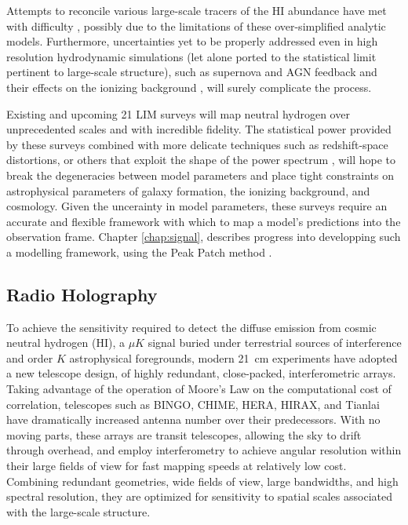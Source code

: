 Attempts to reconcile various large-scale tracers of the HI abundance have met with difficulty \citep{pad2015, castorina2016}, possibly due to the limitations of these over-simplified analytic models.  Furthermore, uncertainties yet to be properly addressed even in high resolution hydrodynamic simulations (let alone ported to the statistical limit pertinent to large-scale structure), such as supernova and AGN feedback and their effects on the ionizing background \citep{pontzenbias}, will surely complicate the process.

Existing and upcoming 21 LIM surveys will map neutral hydrogen over unprecedented scales and with incredible fidelity. The statistical power provided by these surveys combined with more delicate techniques such as redshift-space distortions, or others that exploit the shape of the power spectrum \citep{wolz2017}, will hope to break the degeneracies between model parameters and place tight constraints on astrophysical parameters of galaxy formation, the ionizing background, and cosmology. Given the uncerainty in model parameters, these surveys require an accurate and flexible framework with which to map a model's predictions into the observation frame. Chapter \ref{chap:signal}, describes progress into developping such a modelling framework, using the Peak Patch method \cite{peakpatch1}.

\subsection{\label{sec:bg:subsec:hol} Radio Holography}

To achieve the sensitivity required to detect the diffuse emission from cosmic neutral hydrogen (HI), a $\mu K$ signal buried under terrestrial sources of interference and order $K$ astrophysical foregrounds, modern 21~cm experiments have adopted a new telescope design, of highly redundant, close-packed, interferometric arrays. Taking advantage of the operation of Moore's Law on the computational cost of correlation, telescopes such as BINGO, CHIME, HERA, HIRAX, and Tianlai have dramatically increased antenna number over their predecessors. With no moving parts, these arrays are transit telescopes, allowing the sky to drift through overhead, and employ interferometry to achieve angular resolution within their large fields of view for fast mapping speeds at relatively low cost. Combining redundant geometries, wide fields of view, large bandwidths, and high spectral resolution, they are optimized for sensitivity to spatial scales associated with the large-scale structure.

